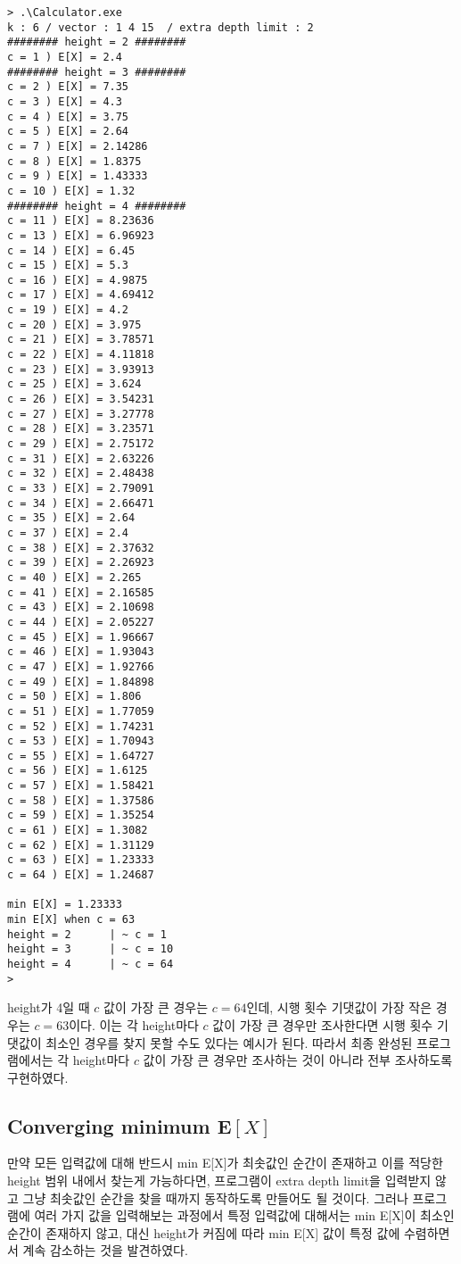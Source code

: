\documentclass[11pt]{article}
\begin{document}
\singlespacing
\begin{verbatim}
> .\Calculator.exe
k : 6 / vector : 1 4 15  / extra depth limit : 2
######## height = 2 ########
c = 1 ) E[X] = 2.4
######## height = 3 ########
c = 2 ) E[X] = 7.35
c = 3 ) E[X] = 4.3
c = 4 ) E[X] = 3.75
c = 5 ) E[X] = 2.64
c = 7 ) E[X] = 2.14286
c = 8 ) E[X] = 1.8375
c = 9 ) E[X] = 1.43333
c = 10 ) E[X] = 1.32
######## height = 4 ########
c = 11 ) E[X] = 8.23636
c = 13 ) E[X] = 6.96923
c = 14 ) E[X] = 6.45
c = 15 ) E[X] = 5.3
c = 16 ) E[X] = 4.9875
c = 17 ) E[X] = 4.69412
c = 19 ) E[X] = 4.2
c = 20 ) E[X] = 3.975
c = 21 ) E[X] = 3.78571
c = 22 ) E[X] = 4.11818
c = 23 ) E[X] = 3.93913
c = 25 ) E[X] = 3.624
c = 26 ) E[X] = 3.54231
c = 27 ) E[X] = 3.27778
c = 28 ) E[X] = 3.23571
c = 29 ) E[X] = 2.75172
c = 31 ) E[X] = 2.63226
c = 32 ) E[X] = 2.48438
c = 33 ) E[X] = 2.79091
c = 34 ) E[X] = 2.66471
c = 35 ) E[X] = 2.64
c = 37 ) E[X] = 2.4
c = 38 ) E[X] = 2.37632
c = 39 ) E[X] = 2.26923
c = 40 ) E[X] = 2.265
c = 41 ) E[X] = 2.16585
c = 43 ) E[X] = 2.10698
c = 44 ) E[X] = 2.05227
c = 45 ) E[X] = 1.96667
c = 46 ) E[X] = 1.93043
c = 47 ) E[X] = 1.92766
c = 49 ) E[X] = 1.84898
c = 50 ) E[X] = 1.806
c = 51 ) E[X] = 1.77059
c = 52 ) E[X] = 1.74231
c = 53 ) E[X] = 1.70943
c = 55 ) E[X] = 1.64727
c = 56 ) E[X] = 1.6125
c = 57 ) E[X] = 1.58421
c = 58 ) E[X] = 1.37586
c = 59 ) E[X] = 1.35254
c = 61 ) E[X] = 1.3082
c = 62 ) E[X] = 1.31129
c = 63 ) E[X] = 1.23333
c = 64 ) E[X] = 1.24687

min E[X] = 1.23333
min E[X] when c = 63
height = 2      | ~ c = 1
height = 3      | ~ c = 10
height = 4      | ~ c = 64
>
\end{verbatim}
\doublespacing

height가 4일 때 $c$ 값이 가장 큰 경우는 $c = 64$인데, 시행 횟수 기댓값이 가장 작은 경우는 $c = 63$이다. 이는 각 height마다 $c$ 값이 가장 큰 경우만 조사한다면 시행 횟수 기댓값이 최소인 경우를 찾지 못할 수도 있다는 예시가 된다. 따라서 최종 완성된 프로그램에서는 각 height마다 $c$ 값이 가장 큰 경우만 조사하는 것이 아니라 전부 조사하도록 구현하였다.

\subsection{Converging minimum $\textbf{E}[X]$}
만약 모든 입력값에 대해 반드시 min E[X]가 최솟값인 순간이 존재하고 이를 적당한 height 범위 내에서 찾는게 가능하다면, 프로그램이 extra depth limit을 입력받지 않고 그냥 최솟값인 순간을 찾을 때까지 동작하도록 만들어도 될 것이다. 그러나 프로그램에 여러 가지 값을 입력해보는 과정에서 특정 입력값에 대해서는 min E[X]이 최소인 순간이 존재하지 않고, 대신 height가 커짐에 따라 min E[X] 값이 특정 값에 수렴하면서 계속 감소하는 것을 발견하였다.
\end{document}
